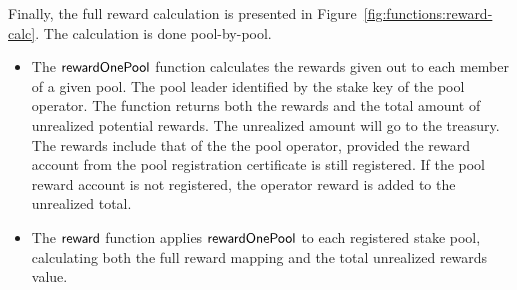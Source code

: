 Finally, the full reward calculation is presented in Figure~\ref{fig:functions:reward-calc}.
The calculation is done pool-by-pool.
\begin{itemize}
  \item The $\mathsf{rewardOnePool}$ function calculates the rewards given out to each member of a
    given pool. The pool leader identified by the stake key of the pool operator.  The function
    returns both the rewards and the total amount of unrealized potential rewards.  The unrealized
    amount will go to the treasury. The rewards include that of the the pool operator, provided
    the reward account from the pool registration certificate is still registered.  If the pool
    reward account is not registered, the operator reward is added to the unrealized total.
  \item The $\mathsf{reward}$ function applies $\mathsf{rewardOnePool}$ to each registered stake
    pool, calculating both the full reward mapping and the total unrealized rewards value.
\end{itemize}

